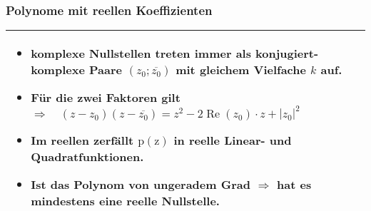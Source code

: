 			\subsubsection{Polynome mit reellen Koeffizienten}
				\begin{tabular}{|m{13cm}|}
					\hline
					\begin{itemize}
						\item komplexe Nullstellen treten immer als konjugiert-komplexe Paare $(z_0; \overline{z_0})$ mit gleichem Vielfache $k$ auf.
						\item Für die zwei Faktoren gilt $\Rightarrow \quad\left(z-z_{0}\right)(z-\overline{z_{0}})=z^{2}-2 \operatorname{Re}\left(z_{0}\right) \cdot z+\left|z_{0}\right|^{2}$
						\item Im reellen zerfällt $\operatorname{p(z)}$ in \textbf{reelle Linear- und Quadratfunktionen}.
						\item Ist das Polynom von \textbf{ungeradem Grad} $\Rightarrow$ hat es \textbf{mindestens eine reelle Nullstelle}.
					\end{itemize}\\[1pt]
					\hline
				\end{tabular}
		
